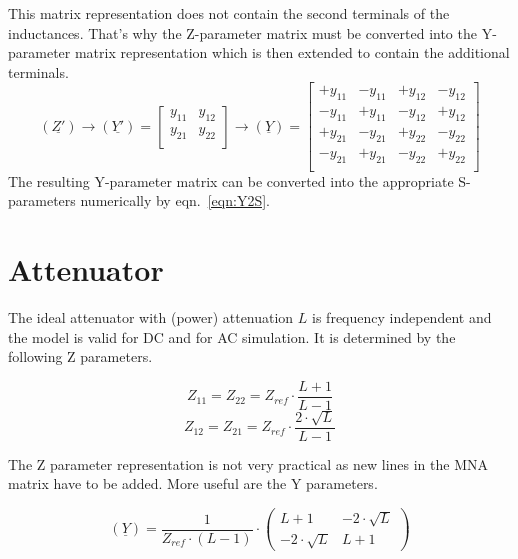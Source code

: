 This matrix representation does not contain the second terminals of
the inductances.  That's why the Z-parameter matrix must be converted
into the Y-parameter matrix representation which is then extended to
contain the additional terminals.
\begin{equation}
\left(\underline{Z'}\right) \rightarrow
\left(\underline{Y'}\right) =
\begin{bmatrix}
y_{11} & y_{12} \\
y_{21} & y_{22} \\
\end{bmatrix} \rightarrow
\left(\underline{Y}\right) =
\begin{bmatrix}
+y_{11} & -y_{11} & +y_{12} & -y_{12} \\
-y_{11} & +y_{11} & -y_{12} & +y_{12} \\
+y_{21} & -y_{21} & +y_{22} & -y_{22} \\
-y_{21} & +y_{21} & -y_{22} & +y_{22} \\
\end{bmatrix}
\end{equation}
The resulting Y-parameter matrix can be converted into the appropriate
S-parameters numerically by eqn.~\eqref{eqn:Y2S}.

\section{Attenuator}
\label{sec:dc_attenuator}

The ideal attenuator with (power) attenuation $L$ is frequency
independent and the model is valid for DC and for AC simulation.
It is determined by the following Z parameters.

\begin{equation}
Z_{11} = Z_{22} = Z_{ref}\cdot\frac{L+1}{L-1}
\end{equation}
\begin{equation}
Z_{12} = Z_{21} = Z_{ref}\cdot\frac{2\cdot\sqrt{L}}{L-1}
\end{equation}

The Z parameter representation is not very practical as new lines
in the MNA matrix have to be added. More useful are the Y parameters.

\begin{equation}
(\underline{Y}) =
\frac{1}{Z_{ref}\cdot (L-1)}\cdot
\begin{pmatrix}
 L+1            & -2\cdot\sqrt{L} \\
-2\cdot\sqrt{L} & L+1
\end{pmatrix}
\end{equation}

